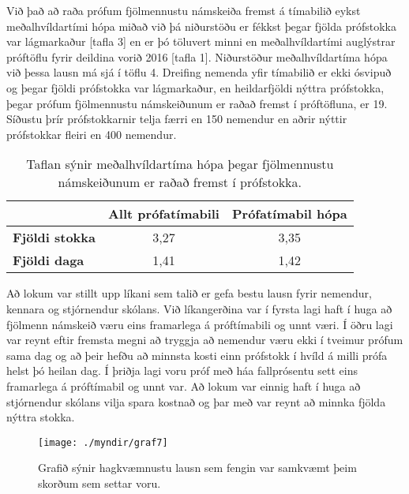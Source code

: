 \documentclass[12pt]{article}
\begin{document}
\newpage

Við það að raða prófum fjölmennustu námskeiða fremst á tímabilið eykst meðalhvíldartími hópa miðað við þá niðurstöðu er fékkst þegar fjölda prófstokka var lágmarkaður [tafla 3] en er þó töluvert minni en meðalhvíldartími auglýstrar próftöflu fyrir deildina vorið 2016 [tafla 1]. Niðurstöður meðalhvíldartíma hópa við þessa lausn má sjá í töflu 4.
Dreifing nemenda yfir tímabilið er ekki ósvipuð og þegar fjöldi prófstokka var lágmarkaður, en heildarfjöldi nýttra prófstokka, þegar prófum fjölmennustu námskeiðunum er raðað fremst í próftöfluna, er 19. Síðustu þrír prófstokkarnir telja færri en 150 nemendur en aðrir nýttir prófstokkar fleiri en 400 nemendur.


\begin{table}[h]
    \centering
    \begin{tabular}{l|c|c|}
        \cline{2-3}
        & \multicolumn{1}{l|}{\textbf{Allt prófatímabili}} & \multicolumn{1}{l|}{\textbf{Prófatímabil hópa}} \\ \hline
        \multicolumn{1}{|l|}{\textbf{Fjöldi stokka}} & 3,27                                             & 3,35                                            \\ \hline
        \multicolumn{1}{|l|}{\textbf{Fjöldi daga}}   & 1,41                                             & 1,42                                            \\ \hline
    \end{tabular}
    \caption{Taflan sýnir meðalhvíldartíma hópa þegar fjölmennustu námskeiðunum er raðað fremst í prófstokka.}
\end{table}

Að lokum var stillt upp líkani sem talið er gefa bestu lausn fyrir nemendur, kennara og stjórnendur skólans.  Við líkangerðina var í fyrsta lagi haft í huga að fjölmenn námskeið væru eins framarlega á próftímabili og unnt væri. Í öðru lagi var reynt eftir fremsta megni að tryggja að nemendur væru ekki í tveimur prófum sama dag og að þeir hefðu að minnsta kosti einn prófstokk í hvíld á milli prófa helst þó heilan dag. Í þriðja lagi voru próf með háa fallprósentu sett eins framarlega á próftímabil og unnt var. Að lokum var einnig haft í huga að stjórnendur skólans vilja spara kostnað og þar með var reynt að minnka fjölda nýttra stokka. 


\begin{figure}[h]
    \centering
    \texttt{[image: ./myndir/graf7]}
    \caption{Grafið sýnir hagkvæmnustu lausn sem fengin var samkvæmt þeim skorðum sem settar voru.}
\end{figure}
\end{document}
